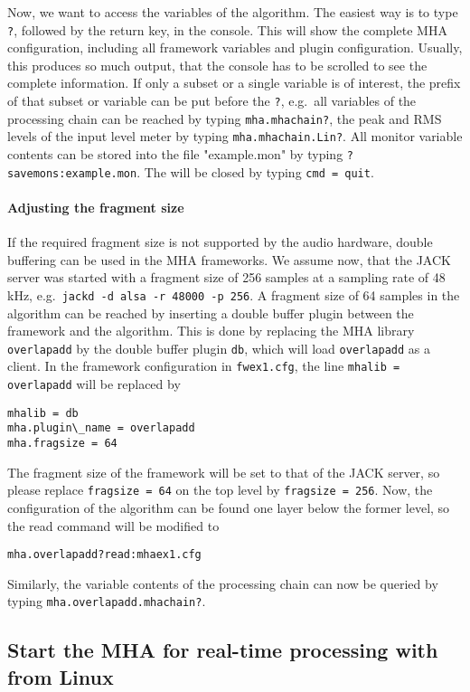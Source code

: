 Now, we want to access the variables of the algorithm. The easiest way
is to type \verb!?!, followed by the return key, in the console. This
will show the complete MHA configuration, including all framework
variables and plugin configuration. Usually, this
produces so much output, that the console has to be scrolled to see
the complete information. If only a subset or a single variable is of
interest, the prefix of that subset or variable can be put before the
\verb!?!, e.g.\ all variables of the processing chain can be reached
by typing \verb!mha.mhachain?!, the peak and RMS levels of the input level
meter by typing \verb!mha.mhachain.Lin?!. All monitor variable contents can
be stored into the file "example.mon" by typing
\verb!?savemons:example.mon!. The \mhad{} will be closed
by typing \verb!cmd = quit!.

\paragraph{Adjusting the fragment size}%
%
%

If the required fragment size is not supported by the audio hardware,
double buffering can be used in the MHA frameworks. We assume now,
that the JACK server was started with a fragment size of 256 samples at
a sampling rate of 48 kHz, e.g.\ \verb!jackd -d alsa -r 48000 -p 256!. A
fragment size of 64 samples in the algorithm can be reached by inserting
a double buffer plugin between the framework and the algorithm. This is
done by replacing the MHA library \verb!overlapadd! by the double
buffer plugin \verb!db!, which will load \verb!overlapadd! as a
client. In the framework configuration in \verb!fwex1.cfg!, the line
\verb!mhalib = overlapadd! will be replaced by
\begin{verbatim}
mhalib = db
mha.plugin\_name = overlapadd
mha.fragsize = 64
\end{verbatim}
The fragment size of the framework will be set to that of the JACK
server, so please replace \verb!fragsize = 64! on the top level by
\verb!fragsize = 256!. Now, the configuration of the algorithm can be
found one layer below the former level, so the read command will be
modified to
\begin{verbatim}
mha.overlapadd?read:mhaex1.cfg
\end{verbatim}
Similarly, the variable contents of the processing chain can now be
queried by typing \verb!mha.overlapadd.mhachain?!.

\subsection{Start the MHA for real-time processing with \Matlab{} from Linux}%
%

